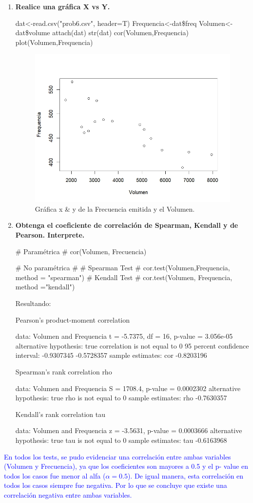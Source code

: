 \documentclass[a4paper,12pt]{article}
\begin{document}
\begin{enumerate} [label=\textbf{\alph*})]
\item \textbf{Realice una gráfica X vs Y.}
\begin{MyVerbatim}
dat<-read.csv("prob6.csv", header=T)
Frequencia<-dat\$freq
Volumen<-dat\$volume
attach(dat)
str(dat)
cor(Volumen,Frequencia)
plot(Volumen,Frequencia)
\end{MyVerbatim}
\begin{figure}[H]
	\centering
	\includegraphics[width=0.7\linewidth]{corr_prob6}
	\caption[cor\_prob6]{Gráfica x \& y de la Frecuencia emitida y el Volumen.}
	\label{fig:corrprob6}
\end{figure}
\item \textbf{Obtenga el coeficiente de correlación de Spearman, Kendall y de Pearson. Interprete.}
\begin{MyVerbatim}
# Paramétrica #
cor(Volumen, Frecuencia)

# No paramétrica #
# Spearman Test #
	cor.test(Volumen,Frequencia, method = "spearman")
# Kendall Test #
	cor.test(Volumen, Frequencia, method ="kendall")
\end{MyVerbatim}
Resultando:
\begin{MyVerbatim}
Pearson's product-moment correlation

data:  Volumen and Frequencia
t = -5.7375, df = 16, p-value = 3.056e-05
alternative hypothesis: true correlation is not equal to 0
95 percent confidence interval:
-0.9307345 -0.5728357
sample estimates:
cor 
-0.8203196 

Spearman's rank correlation rho

data:  Volumen and Frequencia
S = 1708.4, p-value = 0.0002302
alternative hypothesis: true rho is not equal to 0
sample estimates:
rho 
-0.7630357 

Kendall's rank correlation tau

data:  Volumen and Frequencia
z = -3.5631, p-value = 0.0003666
alternative hypothesis: true tau is not equal to 0
sample estimates:
tau 
-0.6163968 
\end{MyVerbatim} 
\end{enumerate}
\textcolor{blue}{En todos los tests, se pudo evidenciar una correlación entre ambas variables (Volumen y Frecuencia), ya que los coeficientes son mayores a 0.5 y el p- value en todos los casos fue menor al alfa (\(\alpha=0.5\)). De igual manera, esta correlación en todos los casos siempre fue negativa. Por lo que se concluye que existe una correlación negativa entre ambas variables.}
\newpage
\end{document}
